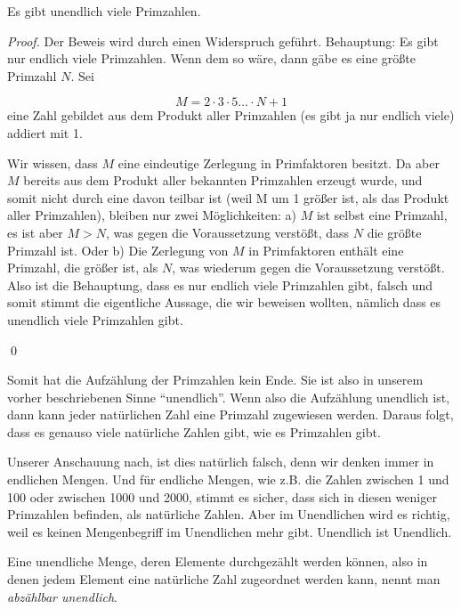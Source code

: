 \begin{lemma}
Es gibt unendlich viele Primzahlen.
\end{lemma}
\begin{proof}
Der Beweis wird durch einen Widerspruch geführt. Behauptung: Es gibt nur endlich viele Primzahlen. Wenn dem so wäre, dann gäbe es eine größte Primzahl $N$. Sei

\[ M = 2\cdot 3\cdot 5\dots \cdot N +1 \]
eine Zahl gebildet aus dem Produkt aller Primzahlen (es gibt ja nur endlich viele) addiert mit 1.

Wir wissen, dass $M$ eine eindeutige Zerlegung in Primfaktoren besitzt. Da aber $M$ bereits aus dem Produkt aller bekannten Primzahlen erzeugt wurde, und somit nicht durch eine davon teilbar ist (weil M um 1 größer ist, als das Produkt aller Primzahlen), bleiben nur zwei Möglichkeiten: a) $M$ ist selbst eine Primzahl, es ist aber $M>N$, was gegen die Voraussetzung verstößt, dass $N$ die größte Primzahl ist. Oder b) Die Zerlegung von $M$ in Primfaktoren enthält eine Primzahl, die größer ist, als $N$, was wiederum gegen die Voraussetzung verstößt. Also ist die Behauptung, dass es nur endlich viele Primzahlen gibt, falsch und somit stimmt die eigentliche Aussage, die wir beweisen wollten, nämlich dass es unendlich viele Primzahlen gibt. 

\qed
\end{proof}

Somit hat die Aufzählung der Primzahlen kein Ende. Sie ist also in unserem vorher beschriebenen Sinne "`unendlich"'. Wenn also die Aufzählung unendlich ist, dann kann jeder natürlichen Zahl eine Primzahl zugewiesen werden. Daraus folgt, dass es genauso viele natürliche Zahlen gibt, wie es Primzahlen gibt. 

Unserer Anschauung nach, ist dies natürlich falsch, denn wir denken immer in endlichen Mengen. Und für endliche Mengen, wie z.B. die Zahlen zwischen 1 und 100 oder zwischen 1000 und 2000, stimmt es sicher, dass sich in diesen weniger Primzahlen befinden, als natürliche Zahlen. Aber im Unendlichen wird es richtig, weil es keinen Mengenbegriff im Unendlichen mehr gibt. Unendlich ist Unendlich.

\begin{definition}
Eine unendliche Menge, deren Elemente durchgezählt werden können, also in denen jedem Element eine natürliche Zahl zugeordnet werden kann, nennt man \textsl{abzählbar unendlich}.\label{abzaehlbar}  
\end{definition}



